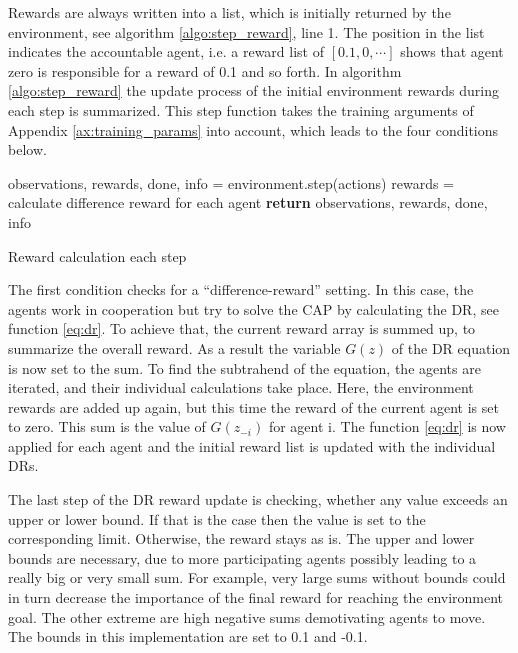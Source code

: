 Rewards are always written into a list, which is initially returned by the environment, see algorithm \ref{algo:step_reward}, line 1. The position in the list indicates the accountable agent, i.e. a reward list of $[0.1, 0, \cdots ]$ shows that agent zero is responsible for a reward of 0.1 and so forth. In algorithm \ref{algo:step_reward} the update process of the initial environment rewards during each step is summarized. This step function takes the training arguments of Appendix \ref{ax:training_params} into account, which leads to the four conditions below.

\begin{algorithm}[H]
    \DontPrintSemicolon
    observations, rewards, done, info = environment.step(actions)\;
    \;
     {
        rewards = calculate difference reward for each agent
    }
    \;
    \;
    \;
    \textbf{return} observations, rewards, done, info\;
    \caption{Reward calculation each step}\label{algo:step_reward}
\end{algorithm}

The first condition checks for a ``difference-reward'' setting. In this case, the agents work in cooperation but try to solve the CAP by calculating the DR, see function \eqref{eq:dr}. To achieve that, the current reward array is summed up, to summarize the overall reward. As a result the variable $G(z)$ of the DR equation is now set to the sum. To find the subtrahend of the equation, the agents are iterated, and their individual calculations take place. Here, the environment rewards are added up again, but this time the reward of the current agent is set to zero. This sum is the value of $G(z_{-i})$ for agent i. The function \eqref{eq:dr} is now applied for each agent and the initial reward list is updated with the individual DRs. 

The last step of the DR reward update is checking, whether any value exceeds an upper or lower bound. If that is the case then the value  is set to the corresponding limit. Otherwise, the reward stays as is. The upper and lower bounds are necessary, due to more participating agents possibly leading to a really big or very small sum. For example, very large sums without bounds could in turn decrease the importance of the final reward for reaching the environment goal. The other extreme are high negative sums demotivating agents to move. The bounds in this implementation are set to 0.1 and -0.1.

